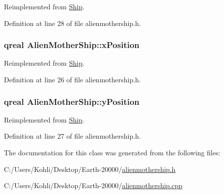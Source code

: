 Reimplemented from \hyperlink{class_ship_ae57e882cf6611414d239b241f6711ba6}{Ship}.

Definition at line 28 of file alienmothership.h.\hypertarget{class_alien_mother_ship_a7c7c0ac12f0eb3add61f5d7a47fe93ee}{
\subsubsection[{xPosition}]{\setlength{\rightskip}{0pt plus 5cm}qreal {\bf AlienMotherShip::xPosition}}}
\label{class_alien_mother_ship_a7c7c0ac12f0eb3add61f5d7a47fe93ee}


Reimplemented from \hyperlink{class_ship_a6ccec9a60696c66ede61af7397c73b3c}{Ship}.

Definition at line 26 of file alienmothership.h.\hypertarget{class_alien_mother_ship_af3b24eae146d655107298345d577d96d}{
\subsubsection[{yPosition}]{\setlength{\rightskip}{0pt plus 5cm}qreal {\bf AlienMotherShip::yPosition}}}
\label{class_alien_mother_ship_af3b24eae146d655107298345d577d96d}


Reimplemented from \hyperlink{class_ship_a5964ed05737d3b6722c7af5e0f173475}{Ship}.

Definition at line 27 of file alienmothership.h.

The documentation for this class was generated from the following files:\begin{DoxyCompactItemize}
\item 
C:/Users/Kohli/Desktop/Earth-\/20000/\hyperlink{alienmothership_8h}{alienmothership.h}\item 
C:/Users/Kohli/Desktop/Earth-\/20000/\hyperlink{alienmothership_8cpp}{alienmothership.cpp}\end{DoxyCompactItemize}
